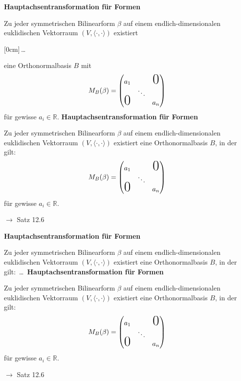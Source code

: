 \documentclass[11pt]{article}
\renewcommand{\cite}[1]{\par\bigskip\hfill{\color{gray}\tiny\(\to\) #1}}
\newcommand{\RR}{\mathbb{R}}
\newcommand*{\scprod}[2]{\langle #1, #2\rangle} %
\newcommand{\hide}[1]{\parbox{0cm}{\raisebox{-7pt}[0cm]{\dots}}\color{white}#1\color{black}}
\let\olddots\dots
\renewcommand{\dots}{\,\olddots\,}
\newenvironment{field}{}{\newpage}
\newif\ifnote
\newenvironment{note}{\notetrue}{\notefalse}
\newcommand{\localtag}{}
\newcommand{\globaltag}{}
\newcommand{\uuid}{}
\newcommand{\tags}[1]{
    \ifnote
        \renewcommand{\localtag}{#1}
    \else
        \renewcommand{\globaltag}{#1}
    \fi
    }
\newcommand{\xplain}[1]{\renewcommand{\uuid}{#1}}
\begin{document}
\begin{note}
    \tags{Satz}
    \xplain{812a96d5-4323-43af-80d4-1227d16c208f}

    \begin{field}
        \textbf{Hauptachsentransformation für Formen}

        Zu jeder symmetrischen Bilinearform $\beta$ auf einem endlich-dimensionalen euklidischen Vektorraum $(V,\scprod{\cdot}{\cdot})$ existiert \hide{eine Orthonormalbasis} $B$ mit
        \[M_B(\beta) = \begin{pmatrix}
            a_1&&\text{\huge 0}\\
            & \ddots&\\
            \smash{\text{\huge 0}}&& a_n
        \end{pmatrix}\]
        für gewisse $a_i\in\RR$.
    \end{field}
    \begin{field}
        \textbf{Hauptachsentransformation für Formen}

        Zu jeder symmetrischen Bilinearform $\beta$ auf einem endlich-dimensionalen euklidischen Vektorraum $(V,\scprod{\cdot}{\cdot})$ existiert eine Orthonormalbasis $B$, in der gilt:
        \[M_B(\beta) = \begin{pmatrix}
            a_1&&\text{\huge 0}\\
            & \ddots&\\
            \smash{\text{\huge 0}}&& a_n
        \end{pmatrix}\]
        für gewisse $a_i\in\RR$.
        \cite{Satz 12.6}
    \end{field}

    \begin{field}
        \textbf{Hauptachsentransformation für Formen}

        Zu jeder symmetrischen Bilinearform $\beta$ auf einem endlich-dimensionalen euklidischen Vektorraum $(V,\scprod{\cdot}{\cdot})$ existiert eine Orthonormalbasis $B$, in der gilt: \dots
    \end{field}
    \begin{field}
        \textbf{Hauptachsentransformation für Formen}

        Zu jeder symmetrischen Bilinearform $\beta$ auf einem endlich-dimensionalen euklidischen Vektorraum $(V,\scprod{\cdot}{\cdot})$ existiert eine Orthonormalbasis $B$, in der gilt:
        \[M_B(\beta) = \begin{pmatrix}
            a_1&&\text{\huge 0}\\
            & \ddots&\\
            \smash{\text{\huge 0}}&& a_n
        \end{pmatrix}\]
        für gewisse $a_i\in\RR$.
        \cite{Satz 12.6}
    \end{field}


\end{note}
\end{document}
